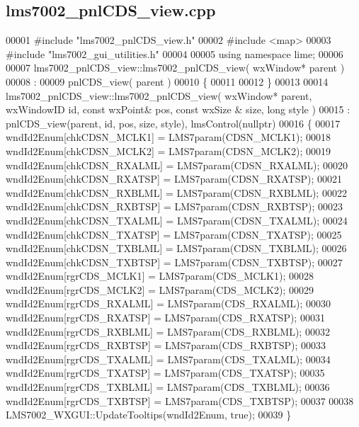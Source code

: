 \subsection{lms7002\+\_\+pnl\+C\+D\+S\+\_\+view.\+cpp}
\label{lms7002__pnlCDS__view_8cpp_source}

\begin{DoxyCode}
00001 \textcolor{preprocessor}{#include "lms7002_pnlCDS_view.h"}
00002 \textcolor{preprocessor}{#include <map>}
00003 \textcolor{preprocessor}{#include "lms7002_gui_utilities.h"}
00004 
00005 \textcolor{keyword}{using namespace }lime;
00006 
00007 lms7002_pnlCDS_view::lms7002_pnlCDS_view( wxWindow* parent )
00008 :
00009 pnlCDS_view( parent )
00010 \{
00011 
00012 \}
00013 
00014 lms7002_pnlCDS_view::lms7002_pnlCDS_view( wxWindow* parent, wxWindowID \textcolor{keywordtype}{id}, \textcolor{keyword}{const} wxPoint& pos, \textcolor{keyword}{const} wxSize
      & size, \textcolor{keywordtype}{long} style )
00015     : pnlCDS_view(parent, id, pos, size, style), lmsControl(nullptr)
00016 \{
00017     wndId2Enum[chkCDSN_MCLK1] = LMS7param(CDSN_MCLK1);
00018     wndId2Enum[chkCDSN_MCLK2] = LMS7param(CDSN_MCLK2);
00019     wndId2Enum[chkCDSN_RXALML] = LMS7param(CDSN_RXALML);
00020     wndId2Enum[chkCDSN_RXATSP] = LMS7param(CDSN_RXATSP);
00021     wndId2Enum[chkCDSN_RXBLML] = LMS7param(CDSN_RXBLML);
00022     wndId2Enum[chkCDSN_RXBTSP] = LMS7param(CDSN_RXBTSP);
00023     wndId2Enum[chkCDSN_TXALML] = LMS7param(CDSN_TXALML);
00024     wndId2Enum[chkCDSN_TXATSP] = LMS7param(CDSN_TXATSP);
00025     wndId2Enum[chkCDSN_TXBLML] = LMS7param(CDSN_TXBLML);
00026     wndId2Enum[chkCDSN_TXBTSP] = LMS7param(CDSN_TXBTSP);
00027     wndId2Enum[rgrCDS_MCLK1] = LMS7param(CDS_MCLK1);
00028     wndId2Enum[rgrCDS_MCLK2] = LMS7param(CDS_MCLK2);
00029     wndId2Enum[rgrCDS_RXALML] = LMS7param(CDS_RXALML);
00030     wndId2Enum[rgrCDS_RXATSP] = LMS7param(CDS_RXATSP);
00031     wndId2Enum[rgrCDS_RXBLML] = LMS7param(CDS_RXBLML);
00032     wndId2Enum[rgrCDS_RXBTSP] = LMS7param(CDS_RXBTSP);
00033     wndId2Enum[rgrCDS_TXALML] = LMS7param(CDS_TXALML);
00034     wndId2Enum[rgrCDS_TXATSP] = LMS7param(CDS_TXATSP);
00035     wndId2Enum[rgrCDS_TXBLML] = LMS7param(CDS_TXBLML);
00036     wndId2Enum[rgrCDS_TXBTSP] = LMS7param(CDS_TXBTSP);
00037 
00038     LMS7002_WXGUI::UpdateTooltips(wndId2Enum, \textcolor{keyword}{true});
00039 \}

\end{DoxyCode}
